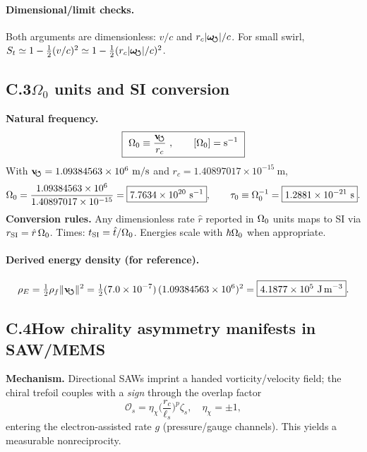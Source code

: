 \documentclass[aps,prb,preprint,amsmath,amssymb]{revtex4-2} %
\newcommand{\vswirlVal}{1.09384563\times10^{6}} %
\newcommand{\rcVal}{1.40897017\times10^{-15}} %
\newcommand{\rhoFVal}{7.0\times10^{-7}} %
\newcommand{\vswirl}{\mathbf{v}_{\!\mkern-2mu\scriptstyle\boldsymbol{\circlearrowleft}}}
\newcommand{\omegas}{\boldsymbol{\omega}_{\!\mkern-2mu\scriptstyle\boldsymbol{\circlearrowleft}}}
\newcommand{\rc}{r_c}
\newcommand{\rhoF}{\rho_{f}}
\newcommand{\rhoE}{\rho_{E}}
\begin{document}
        \paragraph*{Dimensional/limit checks.}
            Both arguments are dimensionless: \(v/c\) and \(\rc |\omegas|/c\). For small swirl, \(S_t\simeq 1-\tfrac{1}{2}(v/c)^2\simeq 1-\tfrac{1}{2}(\rc |\omegas|/c)^2\).

        \subsection*{C.3\quad \texorpdfstring{$\Omega_{0}$}{Omega0} units and SI conversion}
        \textbf{Natural frequency.}
        \begin{align}
            \boxed{\ \OmegaZero \equiv \frac{\vswirl}{\rc}\ ,\qquad [\OmegaZero]=\mathrm{s^{-1}} \ }
            \label{eq:Omega0}
        \end{align}
        With \(\vswirl=\vswirlVal\ \mathrm{m/s}\) and \(\rc=\rcVal\ \mathrm{m}\),
        \[
            \OmegaZero=\frac{\vswirlVal}{\rcVal}=\boxed{7.7634\times 10^{20}\ \mathrm{s^{-1}}},\qquad
            \tau_0\equiv \OmegaZero^{-1}=\boxed{1.2881\times 10^{-21}\ \mathrm{s}}.
        \]
        \textbf{Conversion rules.} Any dimensionless rate \(\hat r\) reported in \(\Omega_{0}\) units maps to SI via \(r_\textrm{SI}=\hat r\,\Omega_{0}\). Times: \(t_\textrm{SI}=\hat t/\Omega_{0}\). Energies scale with \(\hbar\Omega_{0}\) when appropriate.

        \paragraph*{Derived energy density (for reference).}
            \[
                \rhoE=\tfrac12\rhoF\|\vswirl\|^2=\tfrac12(\rhoFVal)\,(\vswirlVal)^2=\boxed{4.1877\times 10^{5}\ \mathrm{J\,m^{-3}}}.
            \]

        \subsection*{C.4\quad How chirality asymmetry manifests in SAW/MEMS}
        \textbf{Mechanism.} Directional SAWs imprint a handed vorticity/velocity field; the chiral trefoil couples with a \emph{sign} through the overlap factor
        \[
            \mathcal O_s=\eta_\chi\Big(\frac{\rc}{\ell_s}\Big)^{p}\zeta_s,\quad \eta_\chi=\pm 1,
        \]
        entering the electron-assisted rate \(g\) (pressure/gauge channels). This yields a measurable nonreciprocity.
\end{document}
